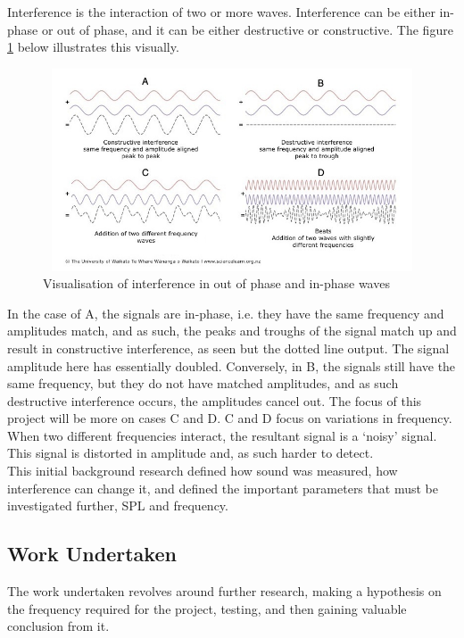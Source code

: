 Interference is the interaction of two or more waves. Interference can be either in-phase or out of phase, and it can be either destructive or constructive. The figure \ref{fig:visualisation_interference_phase_and_inphase} below illustrates this visually. 

\begin{figure}[H]
\centering
\noindent 
\includegraphics[width=12cm,height=6.0cm]{./images/noiseIntersaction}
\caption{Visualisation of interference in out of phase and in-phase waves \cite{noiseInt}}
\label{fig:visualisation_interference_phase_and_inphase}
\end{figure}

In the case of A, the signals are in-phase, i.e. they have the same frequency and amplitudes match, and as such, the peaks and troughs of the signal match up and result in constructive interference, as seen but the dotted line output. The signal amplitude here has essentially doubled. Conversely, in B, the signals still have the same frequency, but they do not have matched amplitudes, and as such destructive interference occurs, the amplitudes cancel out. The focus of this project will be more on cases C and D. C and D focus on variations in frequency. When two different frequencies interact, the resultant signal is a ‘noisy’ signal. This signal is distorted in amplitude and, as such harder to detect.\\ 

This initial background research defined how sound was measured, how interference can change it, and defined the important parameters that must be investigated further, SPL and frequency. 

\subsection{Work Undertaken}

The work undertaken revolves around further research, making a hypothesis on the frequency required for the project, testing, and then gaining valuable conclusion from it. 

